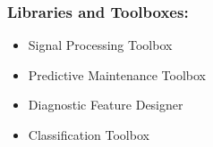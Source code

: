 \documentclass[class=article, crop=false]{standalone}
\begin{document}

%
%
%
\subsubsection{Libraries and Toolboxes:}

\begin{itemize}
\item Signal Processing Toolbox 
\item Predictive Maintenance Toolbox 
\item Diagnostic Feature Designer 
\item Classification Toolbox 
\end{itemize}
\end{document}

